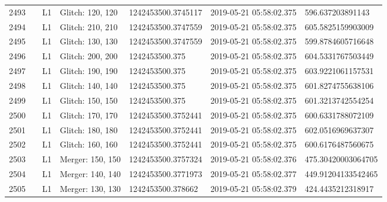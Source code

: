 \begin{longtable}{lllllll}
2493 &                                                    &       L1 &  Glitch: 120, 120 &  1242453500.3745117 &  2019-05-21 05:58:02.375 &    596.637203891143 \\
2494 &                                                    &       L1 &  Glitch: 210, 210 &  1242453500.3747559 &  2019-05-21 05:58:02.375 &   605.5825159903009 \\
2495 &                                                    &       L1 &  Glitch: 130, 130 &  1242453500.3747559 &  2019-05-21 05:58:02.375 &   599.8784605716648 \\
2496 &                                                    &       L1 &  Glitch: 200, 200 &      1242453500.375 &  2019-05-21 05:58:02.375 &   604.5331767503449 \\
2497 &                                                    &       L1 &  Glitch: 190, 190 &      1242453500.375 &  2019-05-21 05:58:02.375 &   603.9221061157531 \\
2498 &                                                    &       L1 &  Glitch: 140, 140 &      1242453500.375 &  2019-05-21 05:58:02.375 &   601.8274755638106 \\
2499 &                                                    &       L1 &  Glitch: 150, 150 &      1242453500.375 &  2019-05-21 05:58:02.375 &   601.3213742554254 \\
2500 &                                                    &       L1 &  Glitch: 170, 170 &  1242453500.3752441 &  2019-05-21 05:58:02.375 &   600.6331788072109 \\
2501 &                                                    &       L1 &  Glitch: 180, 180 &  1242453500.3752441 &  2019-05-21 05:58:02.375 &   602.0516969637307 \\
2502 &                                                    &       L1 &  Glitch: 160, 160 &  1242453500.3752441 &  2019-05-21 05:58:02.375 &   600.6176487560675 \\
2503 &                                                    &       L1 &  Merger: 150, 150 &  1242453500.3757324 &  2019-05-21 05:58:02.376 &  475.30420003064705 \\
2504 &                                                    &       L1 &  Merger: 140, 140 &  1242453500.3771973 &  2019-05-21 05:58:02.377 &  449.91204133542465 \\
2505 &                                                    &       L1 &  Merger: 130, 130 &   1242453500.378662 &  2019-05-21 05:58:02.379 &   424.4435212318917 \\

\end{longtable}

